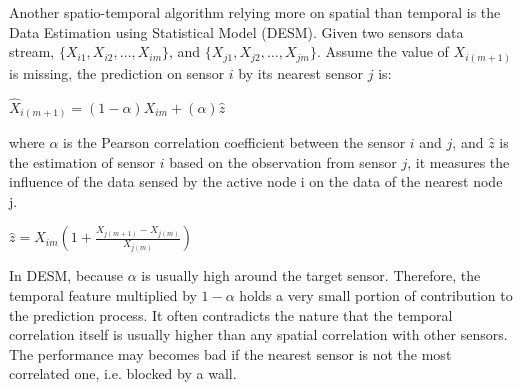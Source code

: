 
Another spatio-temporal algorithm relying more on spatial than temporal is the Data Estimation using Statistical Model (DESM)\cite{li2008data}.  
Given two sensors data stream, $\{X_{i1},X_{i2},\dots,X_{im}\}$, and $\{X_{j1},X_{j2},\dots,X_{jm}\}$. 
Assume the value of $X_{i(m+1)}$ is missing,
the prediction on sensor $i$ by its nearest sensor $j$ is:

$\hat{X}_{i(m+1)} = (1-\alpha)X_{im} + (\alpha)\hat{z}$

where $\alpha$ is the Pearson correlation coefficient between the sensor $i$ and $j$, and $\hat{z}$ is the estimation of sensor $i$ based on the observation from sensor $j$, it measures the influence of the data sensed by the active node i on the data of the nearest node j. 

$\hat{z} = X_{im}(1+\frac{X_{j(m+1)}-X_{j(m)}}{X_{j(m)}})$

In DESM, because $\alpha$ is usually high around the target sensor. Therefore, the temporal feature multiplied by $1-\alpha$ holds a very small portion of contribution to the prediction process. It often contradicts the nature that the temporal correlation itself is usually higher than any spatial correlation with other sensors. The performance may becomes bad if the nearest sensor is not the most correlated one, i.e. blocked by a wall.

